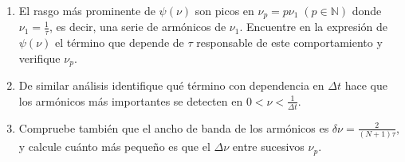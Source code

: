 \begin{enumerate}
	\item El rasgo más prominente de \(\psi(\nu)\) son picos en \(\nu_p = p \nu_1 \; (p \in \mathbb{N})\) donde \(\nu_1 = \frac{1}{\tau}\), es decir, una serie de armónicos de \(\nu_1\).
	Encuentre en la expresión de \(\psi(\nu)\) el término que depende de \(\tau\) responsable de este comportamiento y verifique \(\nu_p\). 
	
	\item De similar análisis identifique qué término con dependencia en \(\Delta t\) hace que los armónicos más importantes se detecten en \(0 < \nu < \frac{1}{\Delta t}\).

	\item Compruebe también que el ancho de banda de los armónicos es \(\delta \nu = \frac{2}{(N+1) \tau}\), y calcule cuánto más pequeño es que el $\Delta \nu$ entre sucesivos $\nu_p$.
\end{enumerate}



